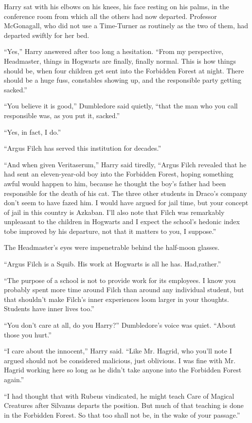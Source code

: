 Harry sat with his elbows on his knees, his face resting on his palms, in the conference room from which all the others had now departed. Professor McGonagall, who did not use a Time-Turner as routinely as the two of them, had departed swiftly for her bed.

“Yes,” Harry answered after too long a hesitation. “From my perspective, Headmaster, things in Hogwarts are finally, finally normal. This is how things should be, when four children get sent into the Forbidden Forest at night. There should be a huge fuss, constables showing up, and the responsible party getting sacked.”

“You believe it is good,” Dumbledore said quietly, “that the man who you call responsible was, as you put it, sacked.”

“Yes, in fact, I do.”

“Argus Filch has served this institution for decades.”

“And when given Veritaserum,” Harry said tiredly, “Argus Filch revealed that he had sent an eleven-year-old boy into the Forbidden Forest, hoping something awful would happen to him, because he thought the boy's father had been responsible for the death of his cat. The three other students in Draco's company don't seem to have fazed him. I would have argued for jail time, but your concept of jail in this country is Azkaban. I'll also note that Filch was remarkably unpleasant to the children in Hogwarts and I expect the school's hedonic index tobe improved by his departure, not that it matters to you, I suppose.”

The Headmaster's eyes were impenetrable behind the half-moon glasses.

“Argus Filch is a Squib. His work at Hogwarts is all he has. Had,rather.”

“The purpose of a school is not to provide work for its employees. I know you probably spent more time around Filch than around any individual student, but that shouldn't make Filch's inner experiences loom larger in your thoughts. Students have inner lives too.”

“You don't care at all, do you Harry?” Dumbledore's voice was quiet. “About those you hurt.”

“I care about the innocent,” Harry said. “Like Mr. Hagrid, who you'll note I argued should not be considered malicious, just oblivious. I was fine with Mr. Hagrid working here so long as he didn't take anyone into the Forbidden Forest again.”

“I had thought that with Rubeus vindicated, he might teach Care of Magical Creatures after Silvanus departs the position. But much of that teaching is done in the Forbidden Forest. So that too shall not be, in the wake of your passage.”

